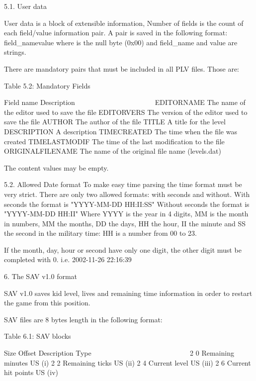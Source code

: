5.1. User data

 User data is a block of extensible information, Number of fields is the
 count of each field/value information pair. A pair is saved in the
 following format:
  field_name\0value\0
 where \0 is the null byte (0x00) and field_name and value are strings.

 There are mandatory pairs that must be included in all PLV files.
 Those are:

                   Table 5.2: Mandatory Fields
                   ~~~~~~~~~~~~~~~~~~~~~~~~~~~

  Field name          Description
  ~~~~~~~~~~          ~~~~~~~~~~~
  EDITORNAME          The name of the editor used to save the file
  EDITORVERS          The version of the editor used to save the file
  AUTHOR              The author of the file
  TITLE               A title for the level
  DESCRIPTION         A description
  TIMECREATED         The time when the file was created
  TIMELASTMODIF       The time of the last modification to the file
  ORIGINALFILENAME    The name of the original file name (levels.dat)

 The content values may be empty.

5.2. Allowed Date format
 To make easy time parsing the time format must be very strict.
 There are only two allowed formats: with seconds and without.
 With seconds the format is "YYYY-MM-DD HH:II:SS"
 Without seconds the format is "YYYY-MM-DD HH:II"
 Where YYYY is the year in 4 digits, MM is the month in numbers, MM the
 months, DD the days, HH the hour, II the minute and SS the second in the
 military time: HH is a number from 00 to 23.

 If the month, day, hour or second have only one digit, the other digit
 must be completed with 0.
 i.e. 2002-11-26 22:16:39


6. The SAV v1.0 format
   ~~~ ~~~ ~~~~ ~~~~~~

 SAV v1.0 saves kid level, lives and remaining time information in order to
 restart the game from this position.

 SAV files are 8 bytes length in the following format:

                   Table 6.1: SAV blocks
                   ~~~~~~~~~~~~~~~~~~~~~

   Size Offset Description                  Type
   ~~~~ ~~~~~~ ~~~~~~~~~~~                  ~~~~
      2      0 Remaining minutes            US   (i)
      2      2 Remaining ticks              US   (ii)
      2      4 Current level                US   (iii)
      2      6 Current hit points           US   (iv)

